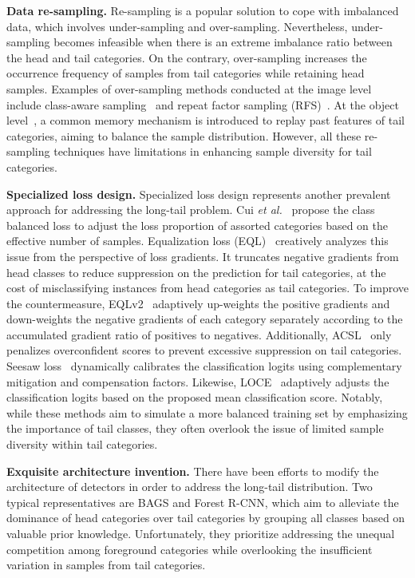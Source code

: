 \documentclass[lettersize,journal]{IEEEtran}
\begin{document}
\noindent\textbf{Data re-sampling.} Re-sampling is a popular solution to cope with imbalanced data, which involves under-sampling and over-sampling.
Nevertheless, under-sampling becomes infeasible when there is an extreme imbalance ratio between the head and tail categories.
On the contrary, over-sampling increases the occurrence frequency of samples from tail categories while retaining head samples.
Examples of over-sampling methods conducted at the image level include class-aware sampling~\cite{shen2016relay} and repeat factor sampling (RFS)~\cite{gupta2019lvis}.
At the object level~\cite{chang2021image}, a common memory mechanism is introduced to replay past features of tail categories, aiming to balance the sample distribution.
However, all these re-sampling techniques have limitations in enhancing sample diversity for tail categories.

\noindent\textbf{Specialized loss design.} Specialized loss design represents another prevalent approach for addressing the long-tail problem.
Cui {\em et al.}~\cite{cui2019class} propose the class balanced loss to adjust the loss proportion of assorted categories based on the effective number of samples.
Equalization loss (EQL)~\cite{tan2020equalization} creatively analyzes this issue from the perspective of loss gradients.
It truncates negative gradients from head classes to reduce suppression on the prediction for tail categories, at the cost of misclassifying instances from head categories as tail categories.
To improve the countermeasure, EQLv2~\cite{tan2021equalization} adaptively up-weights the positive gradients and down-weights the negative gradients of each category separately according to the 
accumulated gradient ratio of positives to negatives.
Additionally, ACSL~\cite{wang2021adaptive} only penalizes overconfident scores to prevent excessive
suppression on tail categories.
Seesaw loss~\cite{wang2021seesaw} dynamically calibrates the classification logits using complementary mitigation and compensation factors.
Likewise, LOCE~\cite{feng2021exploring} adaptively adjusts the classification logits based on the proposed mean classification score.
Notably, while these methods aim to simulate a more balanced training set by emphasizing the importance of tail classes, they often overlook the issue of limited sample diversity within tail categories.

\noindent\textbf{Exquisite architecture invention.} There have been efforts to modify the architecture of detectors in order to address the long-tail distribution.
Two typical representatives are BAGS\cite{li2020overcoming} and Forest R-CNN\cite{wu2020forest}, which aim to alleviate the dominance of head categories over tail categories by grouping all classes based on valuable prior knowledge.
Unfortunately, they prioritize addressing the unequal competition among foreground categories while overlooking the insufficient variation in samples from tail categories.
\end{document}
